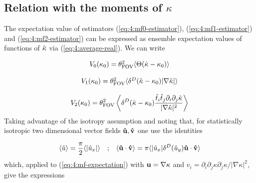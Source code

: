 \subsection{Relation with the moments of $\kappa$}
The expectation value of estimators (\ref{eq:4:mf0-estimator}), (\ref{eq:4:mf1-estimator}) and (\ref{eq:4:mf2-estimator}) can be expressed as ensemble expectation values of functions of $\hat{\kappa}$ via (\ref{eq:4:average-real}). We can write

\begin{equation}
\label{eq:4:mf-expectation}
\begin{matrix}
V_0(\kappa_0) = \theta_{\rm FOV}^2\langle\Theta(\hat{\kappa}-\kappa_0)\rangle \\ \\
V_1(\kappa_0) = \theta_{\rm FOV}^2\langle\delta^D(\hat{\kappa}-\kappa_0)\vert\nabla\hat{\kappa}\vert\rangle \\ \\
\displaystyle V_2(\kappa_0) = \theta_{\rm FOV}^2\left\langle\delta^D(\hat{\kappa}-\kappa_0)\frac{\hat{t}_i\hat{t}_j\partial_i\partial_j\hat{\kappa}}{\vert\nabla\hat{\kappa}\vert^2}\right\rangle
\end{matrix}
\end{equation}
%
Taking advantage of the isotropy assumption and noting that, for statistically isotropic two dimensional vector fields $\mathbf{\hat{u}},\mathbf{\hat{v}}$ one use the identities

\begin{equation}
\label{eq:4:iso-vectors}
\begin{matrix}
\displaystyle \langle\hat{u}\rangle = \frac{\pi}{2}\langle\vert\hat{u}_x\vert\rangle & ; & \displaystyle \langle\mathbf{\hat{u}}\cdot\mathbf{\hat{v}}\rangle = \pi\langle\vert \hat{u}_x\vert\delta^D (\hat{u}_y)\mathbf{\hat{u}}\cdot\mathbf{\hat{v}}\rangle
\end{matrix}
\end{equation}
%
which, applied to (\ref{eq:4:mf-expectation}) with $\mathbf{u}=\nabla\kappa$ and $v_i=\partial_i\partial_j\kappa\partial_j\kappa/\vert\nabla\kappa\vert^2$, give the expressions

